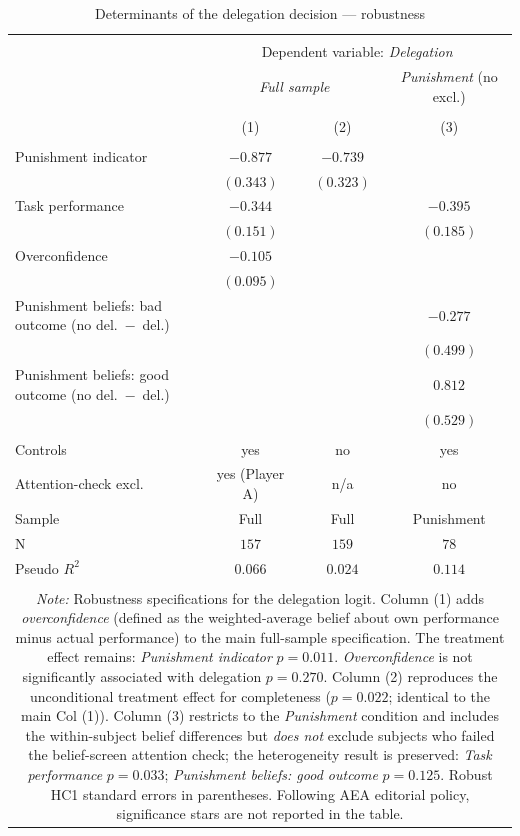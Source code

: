 \begin{table}[!htbp]
\centering
\scriptsize
\caption{Determinants of the delegation decision --- robustness}
\label{tab:reg_delegation_robustness}
\begin{tabular}{@{\extracolsep{5pt}}lcc|c}
\\[-1.8ex]\hline
\hline \\[-1.8ex]
& \multicolumn{3}{c}{Dependent variable: \textit{Delegation}}\\[0.1cm]
& \multicolumn{2}{c}{\textit{Full sample}} & \textit{Punishment} (no excl.) \\
\\[-1.8ex] & (1) & (2) & (3) \\
\hline \\[-1.8ex]
 Punishment indicator & $-0.877$ & $-0.739$ &  \\
  & $(0.343)$ & $(0.323)$ &  \\[0.1cm]
 Task performance & $-0.344$ &  & $-0.395$ \\
  & $(0.151)$ &  & $(0.185)$ \\[0.1cm]
 Overconfidence & $-0.105$ &  &  \\
  & $(0.095)$ &  &  \\[0.1cm]
 Punishment beliefs: bad outcome (no del.~$-$~del.) &  &  & $-0.277$ \\
  &  &  & $(0.499)$ \\[0.1cm]
 Punishment beliefs: good outcome (no del.~$-$~del.) &  &  & $0.812$ \\
  &  &  & $(0.529)$ \\[0.1cm]
\hline \\[-1.8ex]
 Controls & yes & no & yes \\
 Attention-check excl. & yes (Player A) & n/a & no \\
 Sample & Full & Full & Punishment \\
 N & $157$ & $159$ & $78$ \\
 Pseudo $R^2$ & $0.066$ & $0.024$ & $0.114$ \\
\hline
\hline \\[-1.8ex]
\multicolumn{4}{c}{\begin{minipage}{0.85\textwidth}\footnotesize \textit{Note:} Robustness specifications for the delegation logit. Column (1) adds \textit{overconfidence} (defined as the weighted-average belief about own performance minus actual performance) to the main full-sample specification. The treatment effect remains: \textit{Punishment indicator} $p=0.011$. \textit{Overconfidence} is not significantly associated with delegation $p=0.270$. Column (2) reproduces the unconditional treatment effect for completeness ($p=0.022$; identical to the main Col (1)). Column (3) restricts to the \textit{Punishment} condition and includes the within-subject belief differences but \textit{does not} exclude subjects who failed the belief-screen attention check; the heterogeneity result is preserved: \textit{Task performance} $p=0.033$; \textit{Punishment beliefs: good outcome} $p=0.125$. Robust HC1 standard errors in parentheses. Following AEA editorial policy, significance stars are not reported in the table.\end{minipage}}
\end{tabular}
\end{table}
